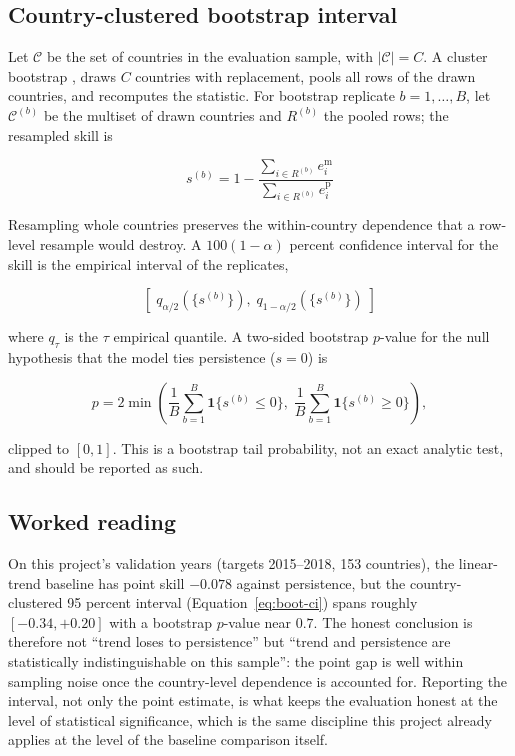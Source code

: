 \subsection{Country-clustered bootstrap interval}

Let $\mathcal{C}$ be the set of countries in the evaluation sample, with
$|\mathcal{C}| = C$. A cluster bootstrap \cite{cameron2008bootstrap},
\cite{efron1993bootstrap} draws $C$ countries with replacement, pools all
rows of the drawn countries, and recomputes the statistic. For bootstrap
replicate $b = 1,\dots,B$, let $\mathcal{C}^{(b)}$ be the multiset of drawn
countries and $R^{(b)}$ the pooled rows; the resampled skill is

\begin{equation}
\label{eq:boot-skill}
s^{(b)} = 1 - \frac{\sum_{i \in R^{(b)}} e_i^{\mathrm{m}}}
                   {\sum_{i \in R^{(b)}} e_i^{\mathrm{p}}}
\end{equation}

Resampling whole countries preserves the within-country dependence that a
row-level resample would destroy. A $100(1-\alpha)$ percent confidence
interval for the skill is the empirical interval of the replicates,

\begin{equation}
\label{eq:boot-ci}
\left[\; q_{\alpha/2}\!\left(\{s^{(b)}\}\right),\;
        q_{1-\alpha/2}\!\left(\{s^{(b)}\}\right) \;\right]
\end{equation}

where $q_\tau$ is the $\tau$ empirical quantile. A two-sided bootstrap
$p$-value for the null hypothesis that the model ties persistence
($s = 0$) is

\begin{equation}
\label{eq:boot-p}
p = 2 \min\!\left(
  \frac{1}{B}\sum_{b=1}^{B}\mathbf{1}\{s^{(b)} \le 0\},\;
  \frac{1}{B}\sum_{b=1}^{B}\mathbf{1}\{s^{(b)} \ge 0\}
\right),
\end{equation}

clipped to $[0,1]$. This is a bootstrap tail probability, not an exact
analytic test, and should be reported as such.

\subsection{Worked reading}

On this project's validation years (targets 2015--2018, 153 countries),
the linear-trend baseline has point skill $-0.078$ against persistence, but
the country-clustered 95 percent interval (Equation~\ref{eq:boot-ci}) spans
roughly $[-0.34, +0.20]$ with a bootstrap $p$-value near $0.7$. The honest
conclusion is therefore not ``trend loses to persistence'' but ``trend and
persistence are statistically indistinguishable on this sample'': the point
gap is well within sampling noise once the country-level dependence is
accounted for. Reporting the interval, not only the point estimate, is what
keeps the evaluation honest at the level of statistical significance, which
is the same discipline this project already applies at the level of the
baseline comparison itself.
